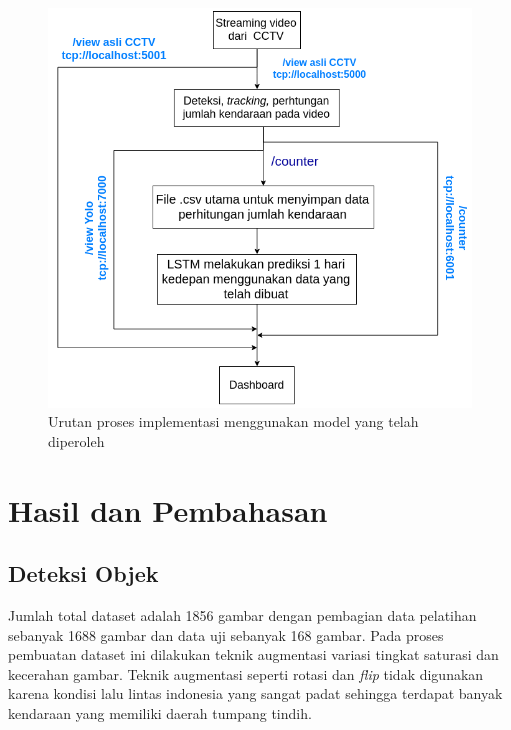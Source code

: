 \documentclass[conference]{IEEEtran}
\begin{document}
\begin{figure}[htp]
	\centering
	\includegraphics[scale=0.5]{Sistem_all}
	\caption{Urutan proses implementasi menggunakan model yang telah diperoleh}
	\label{implementasi_sistem}
\end{figure}

\section{Hasil dan Pembahasan}
\subsection{Deteksi Objek}
Jumlah total dataset adalah 1856 gambar dengan pembagian data pelatihan sebanyak 1688 gambar dan data uji sebanyak 168 gambar.
Pada proses pembuatan dataset ini dilakukan teknik augmentasi variasi tingkat saturasi dan kecerahan gambar. Teknik augmentasi seperti rotasi dan \textit{flip} tidak digunakan karena kondisi lalu lintas indonesia yang sangat padat sehingga 
terdapat banyak kendaraan yang memiliki daerah tumpang tindih.
\end{document}
